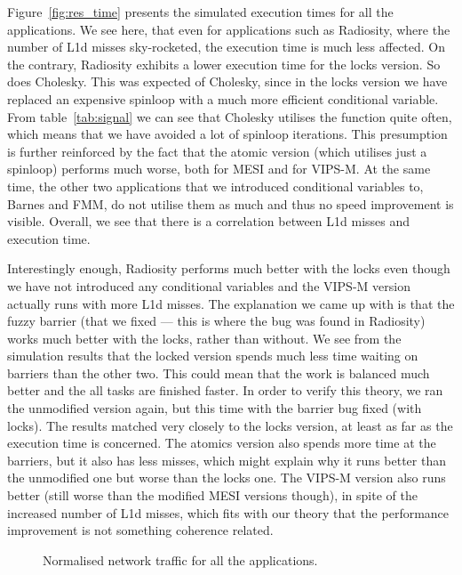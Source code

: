 Figure~\ref{fig:res_time} presents the simulated execution times for all the
applications. We see here, that even for applications such as Radiosity, where
the number of L1d misses sky-rocketed, the execution time is much less affected.
On the contrary, Radiosity exhibits a lower execution time for the locks
version. So does Cholesky. This was expected of Cholesky, since in the locks
version we have replaced an expensive spinloop with a much more efficient
conditional variable. From table~\ref{tab:signal} we can see that Cholesky
utilises the  function quite often, which means that we have avoided
a lot of spinloop iterations. This presumption is further reinforced by the fact
that the atomic version (which utilises just a spinloop) performs much worse,
both for MESI and for VIPS-M. At the same time, the other two applications that
we introduced conditional variables to, Barnes and FMM, do not utilise them as
much and thus no speed improvement is visible.  Overall, we see that there is a
correlation between L1d misses and execution time.

Interestingly enough, Radiosity performs much better with the locks even though
we have not introduced any conditional variables and the VIPS-M version actually
runs with more L1d misses. The explanation we came up with is that the fuzzy
barrier (that we fixed --- this is where the bug was found in Radiosity) works
much better with the locks, rather than without.  We see from the simulation
results that the locked version spends much less time waiting on barriers than
the other two. This could mean that the work is balanced much better and the all
tasks are finished faster. In order to verify this theory, we ran the unmodified
version again, but this time with the barrier bug fixed (with locks). The
results matched very closely to the locks version, at least as far as the
execution time is concerned. The atomics version also spends more time at the
barriers, but it also has less misses, which might explain why it runs better
than the unmodified one but worse than the locks one. The VIPS-M version also
runs better (still worse than the modified MESI versions though), in spite of
the increased number of L1d misses, which fits with our theory that the
performance improvement is not something coherence related.

\begin{figure}
	\caption{Normalised network traffic for all the applications.}
	\label{fig:res_power}
\end{figure}

